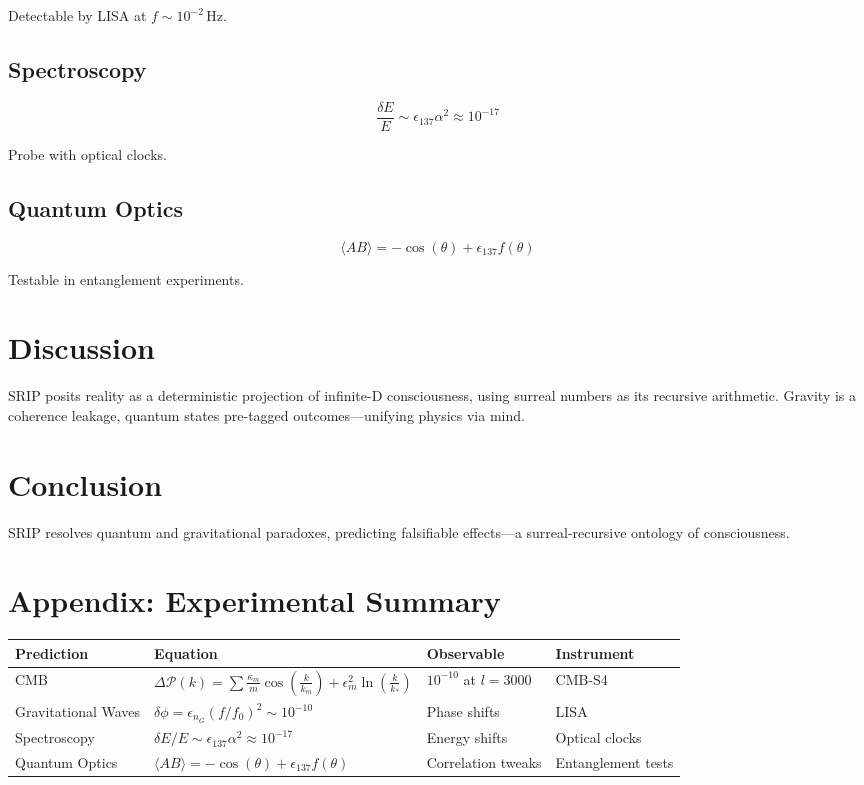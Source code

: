 \documentclass[12pt]{article}
\begin{document}
Detectable by LISA at \(f \sim 10^{-2} \, \text{Hz}\).

\subsection{Spectroscopy}
\[
\frac{\delta E}{E} \sim \epsilon_{137} \alpha^2 \approx 10^{-17}
\]

Probe with optical clocks.

\subsection{Quantum Optics}
\[
\langle A B \rangle = -\cos(\theta) + \epsilon_{137} f(\theta)
\]

Testable in entanglement experiments.

\section{Discussion}
SRIP posits reality as a deterministic projection of infinite-D consciousness, using surreal numbers as its recursive arithmetic. Gravity is a coherence leakage, quantum states pre-tagged outcomes—unifying physics via mind.

\section{Conclusion}
SRIP resolves quantum and gravitational paradoxes, predicting falsifiable effects—a surreal-recursive ontology of consciousness.

\section*{Appendix: Experimental Summary}
\begin{tabularx}{\textwidth}{|l|X|l|l|}
\hline
\textbf{Prediction} & \textbf{Equation} & \textbf{Observable} & \textbf{Instrument} \\
\hline
CMB & \(\Delta \mathcal{P}(k) = \sum \frac{\kappa_m}{m} \cos\left(\frac{k}{k_m}\right) + \epsilon_m^2 \ln\left(\frac{k}{k_*}\right)\) & \(10^{-10}\) at \(l = 3000\) & CMB-S4 \\
\hline
Gravitational Waves & \(\delta \phi = \epsilon_{n_G} (f/f_0)^2 \sim 10^{-10}\) & Phase shifts & LISA \\
\hline
Spectroscopy & \(\delta E / E \sim \epsilon_{137} \alpha^2 \approx 10^{-17}\) & Energy shifts & Optical clocks \\
\hline
Quantum Optics & \(\langle A B \rangle = -\cos(\theta) + \epsilon_{137} f(\theta)\) & Correlation tweaks & Entanglement tests \\
\hline
\end{tabularx}
\end{document}
